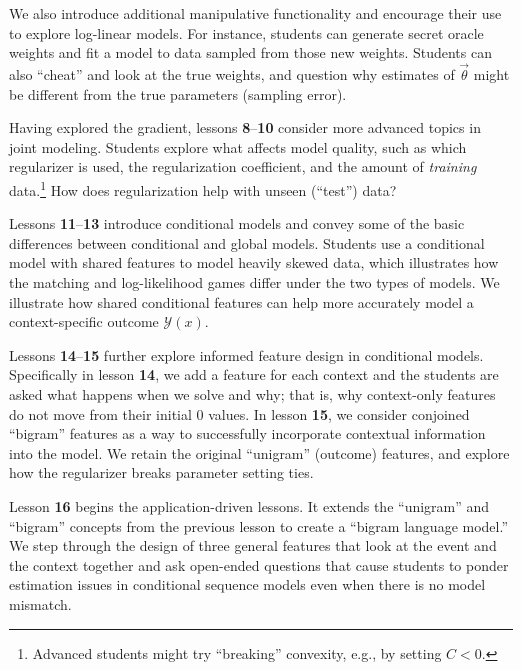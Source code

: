 \documentclass[11pt,letterpaper]{article}
\begin{document}
We also introduce additional manipulative functionality and encourage their use to 
explore log-linear models. For instance, students can generate secret oracle weights and 
fit a model to data sampled from those new weights. Students can also ``cheat'' and look at the true 
weights,  and question why estimates of $\vec{\theta}$ might be different from the true parameters 
(sampling error).

Having explored the gradient, lessons \textbf{8}--\textbf{10} consider more advanced topics in joint 
modeling. Students explore what affects model quality, such as which regularizer is used, the 
regularization coefficient, and the amount of \textit{training} data.\footnote{Advanced 
students might try ``breaking'' convexity, e.g., by setting $C < 0$.} How does regularization help with 
unseen (``test'') data? 

Lessons \textbf{11}--\textbf{13} introduce conditional models and convey some of the basic differences between 
conditional and global models. Students use a conditional model with shared features to model 
heavily skewed data, which illustrates how the matching and log-likelihood games differ under the two types of 
models. We illustrate how shared conditional features can help more accurately model a context-specific 
outcome $\mathcal{Y}(x)$.

Lessons \textbf{14}--\textbf{15} further explore informed feature design in conditional models. 
Specifically in lesson \textbf{14}, we add a feature for each context and the students are asked what happens 
when we solve and why; that is, why context-only features do not move from their initial 0 values. 
In lesson \textbf{15}, we consider conjoined ``bigram'' features as a way to successfully incorporate 
contextual information into the model. We retain the original ``unigram'' (outcome) features, and explore
how the regularizer breaks parameter setting ties.

Lesson \textbf{16} begins the application-driven lessons. It extends the ``unigram'' and ``bigram'' concepts 
from the previous lesson to create a ``bigram language model.'' We step through the design of three general 
features that look at the event and the context together and ask open-ended questions that cause students 
to ponder estimation issues in conditional sequence models even when there is no model mismatch.
\end{document}
